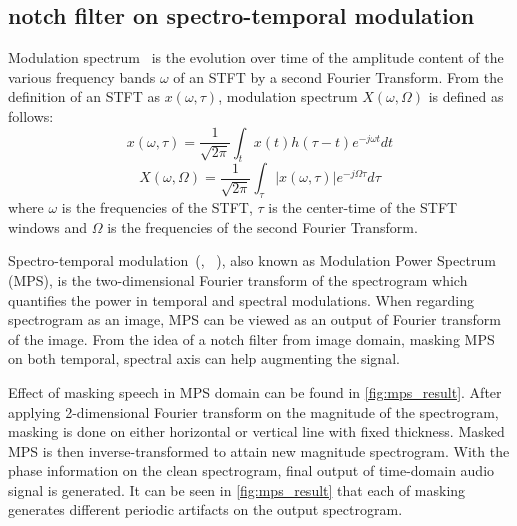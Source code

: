 \documentclass[10pt,twocolumn,letterpaper]{article}
\begin{document}
\subsection{notch filter on spectro-temporal modulation}
\label{sec:notch}
Modulation spectrum~\cite{marchand2014modulation} is the evolution over time of the amplitude content 
of the various frequency bands $\omega$ of an STFT by a second Fourier Transform.
From the definition of an STFT as $x(\omega, \tau)$, modulation spectrum $X(\omega, \Omega)$ is defined
as follows: 
\begin{equation}
x(\omega, \tau) = \frac{1}{\sqrt{2\pi}}\int_t x(t)h(\tau - t)e^{-j\omega t}dt
\end{equation}
\begin{equation}
X(\omega, \Omega) = \frac{1}{\sqrt{2\pi}}\int_{\tau} |x(\omega, \tau)|e^{-j\Omega\tau}d\tau
\end{equation}
where $\omega$ is the frequencies of the STFT, $\tau$ is the center-time of the STFT windows and 
$\Omega$ is the frequencies of the second Fourier Transform. 

Spectro-temporal modulation~(\cite{chi1999spectro}, ~\cite{singh2003modulation}), also known as 
Modulation Power Spectrum (MPS), is the two-dimensional Fourier transform of the spectrogram which 
quantifies the power in temporal and spectral modulations. When regarding spectrogram as an image,
MPS can be viewed as an output of Fourier transform of the image. From the idea of a notch filter from
image domain, masking MPS on both temporal, spectral axis can help augmenting the signal.

Effect of masking speech in MPS domain can be found in \cref{fig:mps_result}. After applying 2-dimensional
Fourier transform on the magnitude of the spectrogram, masking is done on either horizontal or vertical line 
with fixed thickness. Masked MPS is then inverse-transformed to attain new magnitude spectrogram. With the 
phase information on the clean spectrogram, final output of time-domain audio signal is generated.
It can be seen in \cref{fig:mps_result} that each of masking generates different periodic artifacts 
on the output spectrogram.
\end{document}
